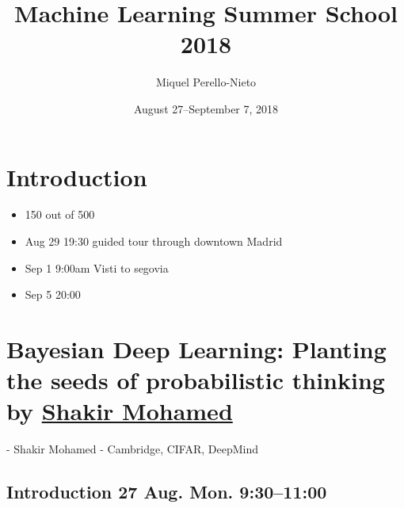 \documentclass[b5paper]{report}
\title{Machine Learning Summer School 2018}
\author{Miquel Perello-Nieto}
\date{August 27--September 7, 2018}
\begin{document}
\maketitle
\tableofcontents

%



\chapter{Introduction}

\begin{itemize}
  \item 150 out of 500
  \item Aug 29 19:30 guided tour through downtown Madrid
  \item Sep 1 9:00am Visti to segovia
  \item Sep 5 20:00
\end{itemize}

\chapter{Bayesian Deep Learning: Planting the seeds of probabilistic thinking
by \href{https://shakirm.com/}{Shakir Mohamed}}

- Shakir Mohamed
- Cambridge, CIFAR, DeepMind

\section{Introduction 27 Aug. Mon. 9:30--11:00}
\end{document}
